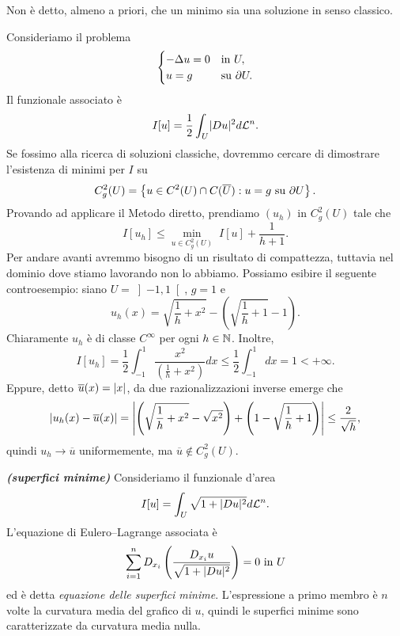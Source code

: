 Non è detto, almeno a priori, che un minimo sia una soluzione in senso classico.
\begin{esempio}
	Consideriamo il problema
	\[ 	\begin{cases}
		-\Delta u = 0 & \textup{in } U,\\
		u= g & \textup{su } \partial U.
	\end{cases} \]
	Il funzionale associato è 
	\[ I[u] = \frac{1}{2}\int_U \abs{Du}^2 d\mathcal{L}^n. \]
	Se fossimo alla ricerca di soluzioni classiche, dovremmo cercare di dimostrare l'esistenza di minimi per $I$ su
	\[ C^2_g(U) = \left\lbrace u \in C^2(U) \cap C(\overline{U}): u = g \textup{ su } \partial U\right\rbrace. \]
	Provando ad applicare il Metodo diretto, prendiamo $(u_h)$ in $C^2_g(U)$ tale che 
	\[ I[u_h] \le \underset{u \in  C^2_g(U)}{\min}\;I[u] + \frac{1}{h+1}. \]
	Per andare avanti avremmo bisogno di un risultato di compattezza, tuttavia nel dominio dove stiamo lavorando non lo abbiamo. Possiamo esibire il seguente controesempio: siano $U = \left] -1,1\right[ $, $g = 1$ e 
	\[ u_h(x) = \sqrt{\frac{1}{h} +x^2} - \left( \sqrt{\frac{1}{h} +1}-1\right).  \]
	Chiaramente $u_h$ è di classe $C^\infty$ per ogni $h \in \N$. Inoltre,
	\[ I[u_h] = \frac{1}{2}\int_{-1}^{1} \frac{x^2}{\left( \frac{1}{h}+x^2\right) }dx \le \frac{1}{2} \int_{-1}^{1}dx = 1 < +\infty. \]
	Eppure, detto $\overline{u}(x) = \abs{x}$, da due razionalizzazioni inverse emerge che
	\[ \abs{u_h(x) - \overline{u}(x)} = \abs*{\left( \sqrt{ \frac{1}{h} + x^2} - \sqrt{x^2}\right) + \left( 1-  \sqrt{ \frac{1}{h} + 1}\right) }\le \frac{2}{\sqrt{h}}, \]
	quindi $u_h \to \overline{u}$ uniformemente, ma $\overline{u} \notin C^2_g(U)$.
\end{esempio}
\begin{esempio}\textbf{\emph{(superfici minime)}}
	Consideriamo il funzionale d'area 
	\[ I[u] = \int_U \sqrt{1 + \abs{Du}^2}d\mathcal{L}^n. \]
	L'equazione di Eulero--Lagrange associata è 
	\[ \sum_{i=1}^nD_{x_i}\left( \frac{D_{x_i} u}{\sqrt{1 + \abs{Du}^2}}\right)  = 0 \textup{ in } U \]
	ed è detta \emph{equazione delle superfici minime}. L'espressione a primo membro è $n$ volte la curvatura media del grafico di $u$, quindi le superfici minime sono caratterizzate da curvatura media nulla.
\end{esempio}

